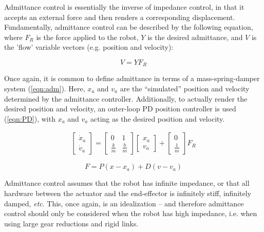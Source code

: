 \documentclass[12pt]{report}
\begin{document}
	Admittance control is essentially the inverse of impedance control, in that it accepts an external force and then renders a corresponding displacement. Fundamentally, admittance control can be described by the following equation, where $F_R$ is the force applied to the robot, $Y$ is the desired admittance, and $V$ is the 'flow' variable vectors (e.g. position and velocity):
	
	\begin{equation}
	V = YF_R 
	\end{equation} 
	
	Once again, it is common to define admittance in terms of a mass-spring-damper system (\ref{eqn:adm}). Here, $x_a$ and $v_a$ are the ``simulated'' position and velocity determined by the admittance controller. Additionally, to actually render the desired position and velocity, an outer-loop PD position controller is used (\ref{eqn:PD}), with $x_a$ and $v_a$ acting as the desired position and velocity. 
	
	\begin{gather} \label{eqn:adm}
	\begin{bmatrix}
    	\dot{x}_a \\
    	\dot{v}_a 
    \end{bmatrix} 
    =
    \begin{bmatrix}
    	0 & 1 \\
    	\frac{k}{m} & \frac{b}{m}
    \end{bmatrix} 
    \begin{bmatrix}
    	x_a \\
    	v_a
    \end{bmatrix}  
    +
    \begin{bmatrix}
    	0 \\
    	\frac{1}{m}
    \end{bmatrix}
    F_R   	
	\end{gather}
	
	\begin{equation} \label{eqn:PD}
	F = P(x - x_a) + D(v - v_a)
	\end{equation}

	Admittance control assumes that the robot has infinite impedance, or that all hardware between the actuator and the end-effector is infinitely stiff, infinitely damped, \textit{etc}. This, once again, is an idealization -- and therefore admittance control should only be considered when the robot has high impedance, i.e. when using large gear reductions and rigid links. 
	
\end{document}
